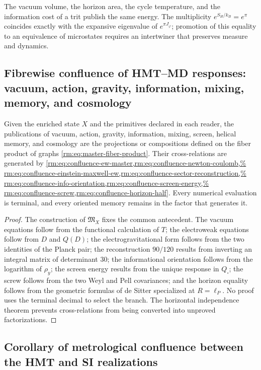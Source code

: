 The vacuum volume, the horizon area, the cycle temperature, and the information cost of a trit publish the same energy. The multiplicity \(e^{S_H/k_B}=e^\pi\) coincides exactly with the expansive eigenvalue of \(e^{\pi J_\varphi}\); promotion of this equality to an equivalence of microstates requires an intertwiner that preserves measure and dynamics.

\subsection{Fibrewise confluence of HMT–MD responses: vacuum, action, gravity, information, mixing, memory, and cosmology}

\begin{theorem}
Given the enriched state \(X\) and the primitives declared in each reader, the publications of vacuum, action, gravity, information, mixing, screen, helical memory, and cosmology are the projections or compositions defined on the fiber product of graphs \cref{rm:eq:master-fiber-product}. Their cross-relations are generated by \cref{rm:eq:confluence-ew-master,rm:eq:confluence-newton-coulomb,%
rm:eq:confluence-einstein-maxwell-ew,rm:eq:confluence-sector-reconstruction,%
rm:eq:confluence-info-orientation,rm:eq:confluence-screen-energy,%
rm:eq:confluence-screw,rm:eq:confluence-horizon-half}.
Every numerical evaluation is terminal, and every
oriented memory remains in the factor that generates it.
\end{theorem}

\begin{proof}
The construction of \(\mathfrak M_X\) fixes the common antecedent. The
vacuum equations follow from the functional calculation of \(T\); the
electroweak equations follow from \(D\) and \(Q(D)\); the electrogravitational form follows
from the two identities of the Planck pair; the reconstruction \(90/120\)
results from inverting an integral matrix of determinant \(30\); the informational orientation
follows from the logarithm of \(\rho_y\); the screen energy
results from the unique response in \(Q_{\square}\); the screw follows from the
two Weyl and Pell covariances; and the horizon equality follows from the
geometric formulas of de Sitter specialized at \(R=\ell_P\). No
proof uses the terminal decimal to select the branch. The horizontal
independence theorem prevents cross-relations from being converted into
unproved factorizations.
\end{proof}

\subsection{Corollary of metrological confluence between the HMT and SI realizations}


